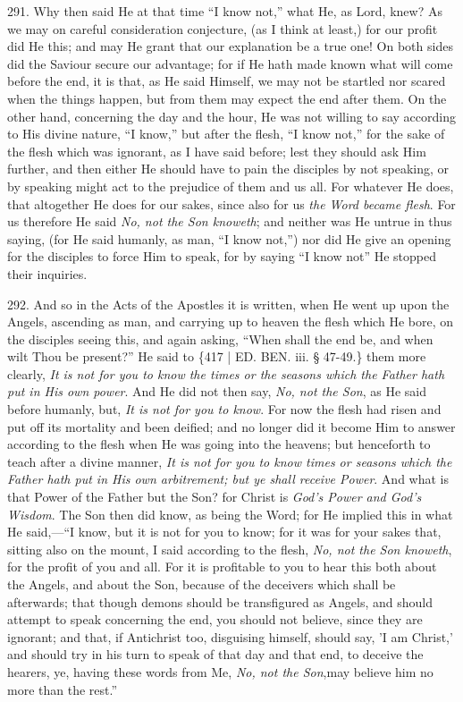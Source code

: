 291.
Why then said He at that time ``I know not,'' what He, as Lord, knew? As
we may on careful consideration conjecture, (as I think at least,) for
our profit did He this; and may He grant that our explanation be a
true one! On both sides did the Saviour secure our advantage; for if
He hath made known what will come before the end, it is that, as He
said Himself, we may not be startled nor scared when the things
happen, but from them may expect the end after them. On the other
hand, concerning the day and the hour, He was not willing to say
according to His divine nature, ``I know,'' but after the flesh, ``I know
not,'' for the sake of the flesh which was ignorant, as I have said
before; lest they should ask Him further, and then either He should
have to pain the disciples by not speaking, or by speaking might act
to the prejudice of them and us all. For whatever He does, that
altogether He does for our sakes, since also for us \emph{the Word became
flesh}. For us therefore He said \emph{No, not the Son knoweth};
and neither was He untrue in thus saying, (for He said humanly, as
man, ``I know not,'') nor did He give an opening for the disciples to
force Him to speak, for by saying ``I know not'' He stopped their
inquiries.

292.
And so in the Acts of the Apostles it is written, when He went up upon
the Angels, ascending as man, and carrying up to heaven the flesh
which He bore, on the disciples seeing this, and again asking, ``When
shall the end be, and when wilt Thou be present?'' He said to \{417 | ED.
BEN.
iii. § 47-49.\} them more clearly, \emph{It is not for you to know the
times or the seasons which the Father hath put in His own power}.
And He did not then say, \emph{No, not the Son}, as He said before
humanly, but, \emph{It is not for you to know}. For now the flesh had
risen and put off its mortality and been deified; and no longer did it
become Him to answer according to the flesh when He was going into the
heavens; but henceforth to teach after a divine manner, \emph{It is not
for you to know times or seasons which the Father hath put in His own
arbitrement; but ye shall receive Power}. And what is that Power of
the Father but the Son? for Christ is \emph{God's Power and God's Wisdom}.
The Son then did know, as being the Word; for He implied this in what
He said,—``I know, but it is not for you to know; for it was for your
sakes that, sitting also on the mount, I said according to the flesh, \emph{No,
not the Son knoweth}, for the profit of you and all. For it is
profitable to you to hear this both about the Angels, and about the
Son, because of the deceivers which shall be afterwards; that though
demons should be transfigured as Angels, and should attempt to speak
concerning the end, you should not believe, since they are ignorant;
and that, if Antichrist too, disguising himself, should say, 'I am
Christ,' and should try in his turn to speak of that day and that end,
to deceive the hearers, ye, having these words from Me, \emph{No, not the
Son},\emph{}may believe him no more than the rest.''

